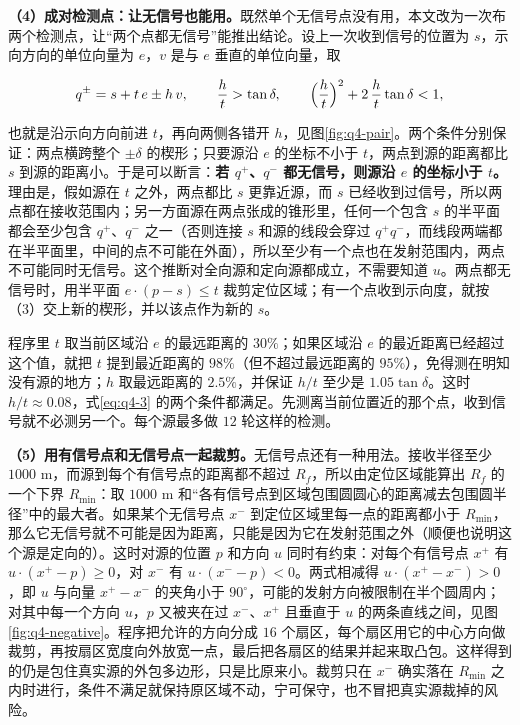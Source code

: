 \textbf{（4）成对检测点：让无信号也能用。}既然单个无信号点没有用，本文改为一次布两个检测点，让“两个点都无信号”能推出结论。设上一次收到信号的位置为 $s$，示向方向的单位向量为 $e$，$v$ 是与 $e$ 垂直的单位向量，取

\begin{equation}\label{eq:q4-3}
q^{\pm}=s+t\,e\pm h\,v,\qquad
\frac ht>\tan\delta,\qquad
\Bigl(\frac ht\Bigr)^2+2\,\frac ht\tan\delta<1 ,
\end{equation}

也就是沿示向方向前进 $t$，再向两侧各错开 $h$，见图\ref{fig:q4-pair}。两个条件分别保证：两点横跨整个 $\pm\delta$ 的楔形；只要源沿 $e$ 的坐标不小于 $t$，两点到源的距离都比 $s$ 到源的距离小。于是可以断言：\textbf{若 $q^+$、$q^-$ 都无信号，则源沿 $e$ 的坐标小于 $t$。}理由是，假如源在 $t$ 之外，两点都比 $s$ 更靠近源，而 $s$ 已经收到过信号，所以两点都在接收范围内；另一方面源在两点张成的锥形里，任何一个包含 $s$ 的半平面都会至少包含 $q^+$、$q^-$ 之一（否则连接 $s$ 和源的线段会穿过 $q^+q^-$，而线段两端都在半平面里，中间的点不可能在外面），所以至少有一个点也在发射范围内，两点不可能同时无信号。这个推断对全向源和定向源都成立，不需要知道 $u$。两点都无信号时，用半平面 $e\cdot(p-s)\le t$ 裁剪定位区域；有一个点收到示向度，就按（3）交上新的楔形，并以该点作为新的 $s$。

程序里 $t$ 取当前区域沿 $e$ 的最远距离的 $30\%$；如果区域沿 $e$ 的最近距离已经超过这个值，就把 $t$ 提到最近距离的 $98\%$（但不超过最远距离的 $95\%$），免得测在明知没有源的地方；$h$ 取最远距离的 $2.5\%$，并保证 $h/t$ 至少是 $1.05\tan\delta$。这时 $h/t\approx0.08$，式\eqref{eq:q4-3} 的两个条件都满足。先测离当前位置近的那个点，收到信号就不必测另一个。每个源最多做 $12$ 轮这样的检测。

\begin{center}
\begin{minipage}{\linewidth}
\centering
\QFourPairFigure
{}
\label{fig:q4-pair}
\end{minipage}
\end{center}

\textbf{（5）用有信号点和无信号点一起裁剪。}无信号点还有一种用法。接收半径至少 $1000$ m，而源到每个有信号点的距离都不超过 $R_f$，所以由定位区域能算出 $R_f$ 的一个下界 $R_{\min}$：取 $1000$ m 和“各有信号点到区域包围圆圆心的距离减去包围圆半径”中的最大者。如果某个无信号点 $x^-$ 到定位区域里每一点的距离都小于 $R_{\min}$，那么它无信号就不可能是因为距离，只能是因为它在发射范围之外（顺便也说明这个源是定向的）。这时对源的位置 $p$ 和方向 $u$ 同时有约束：对每个有信号点 $x^+$ 有 $u\cdot(x^+-p)\ge0$，对 $x^-$ 有 $u\cdot(x^--p)<0$。两式相减得 $u\cdot(x^+-x^-)>0$，即 $u$ 与向量 $x^+-x^-$ 的夹角小于 $90^\circ$，可能的发射方向被限制在半个圆周内；对其中每一个方向 $u$，$p$ 又被夹在过 $x^-$、$x^+$ 且垂直于 $u$ 的两条直线之间，见图\ref{fig:q4-negative}。程序把允许的方向分成 $16$ 个扇区，每个扇区用它的中心方向做裁剪，再按扇区宽度向外放宽一点，最后把各扇区的结果并起来取凸包。这样得到的仍是包住真实源的外包多边形，只是比原来小。裁剪只在 $x^-$ 确实落在 $R_{\min}$ 之内时进行，条件不满足就保持原区域不动，宁可保守，也不冒把真实源裁掉的风险。

